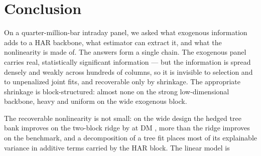 \section{Conclusion}
\label{sec:conclusion}

On a quarter-million-bar intraday panel, we asked what exogenous
information adds to a HAR backbone, what estimator can extract it, and
what the nonlinearity is made of. The answers form a single chain. The
exogenous panel carries real, statistically significant information ---
but the information is spread densely and weakly across hundreds of
columns, so it is invisible to selection and to unpenalized joint fits,
and recoverable only by shrinkage. The appropriate shrinkage is
block-structured: almost none on the strong low-dimensional backbone,
heavy and uniform on the wide exogenous block.

The recoverable nonlinearity is not small: on the wide design the hedged
tree bank improves on the two-block ridge by \unifTreeBankHedgeVsBlkTwoDQ{} at
DM \unifTreeBankHedgeVsBlkTwoDM{}, more than the ridge improves on the
benchmark, and a decomposition of a tree fit places most of its explainable
variance in additive terms carried by the HAR block. The linear model is
